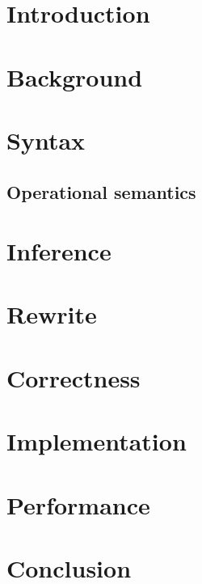 \documentclass[11pt,a4paper]{report}
\begin{document}
\tableofcontents

\chapter{Introduction}\label{sec:introduction}


\chapter{Background}\label{sec:background}


\chapter{Syntax}\label{sec:syntax}

\section{Operational semantics}\label{sec:semantics}


\chapter{Inference}\label{sec:inference}



\chapter{Rewrite}\label{sec:rewrite}



\chapter{Correctness}\label{sec:correctness}



\chapter{Implementation}\label{sec:implementation}


\chapter{Performance}\label{sec:performance}


\chapter{Conclusion}\label{sec:conclusion}




\end{document}
